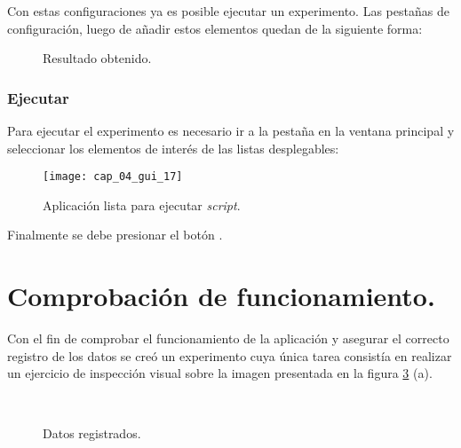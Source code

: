 \documentclass[\main/Main.tex]{subfiles}
\begin{document}
                Con estas configuraciones ya es posible ejecutar un experimento. Las pestañas de configuración, luego de añadir estos elementos quedan de la siguiente forma:
                \begin{figure}[H]
                    \centering
                     \hspace{5mm}
                    \caption{Resultado obtenido.}
                    \label{fig:04_gui_final_01}
                \end{figure} 

            \subsubsection{Ejecutar}
                Para ejecutar el experimento es necesario ir a la pestaña  en la ventana principal y seleccionar los elementos de interés de las listas desplegables:
                \begin{figure}[H]
                    \centering
                    \texttt{[image: cap\_04\_gui\_17]}
                    \caption{Aplicación lista para ejecutar \textit{script}.}
                    \label{fig:04_gui_final_02}
                \end{figure} 

                Finalmente se debe presionar el botón .

    \newpage
    \section{Comprobación de funcionamiento.}
    \label{sec:04_funcionamiento}
        Con el fin de comprobar el funcionamiento de la aplicación y asegurar el correcto registro de los datos se creó un experimento cuya única tarea consistía en realizar un ejercicio de inspección visual sobre la imagen presentada en la figura \ref{fig:04_frame_result} (a). 
        \begin{figure}[H]
            \centering
            \\
            \hspace{5mm}
            \caption{Datos registrados.}
            \label{fig:04_frame_result}
        \end{figure}
\end{document}
